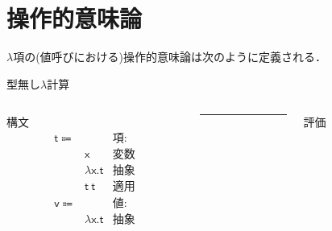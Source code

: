 \documentclass[9pt]{beamer}
\begin{document}
\section{操作的意味論}
\begin{frame}
$\lambda$項の(値呼びにおける)操作的意味論は次のように定義される．
\begin{block}{型無し$\lambda$計算}
    \begin{columns}\begin{column}{0.48\textwidth}
    構文\begin{align*}
\mathsf{t}\Coloneq& &\text{項:}\\
&\mathsf{x} &\text{変数}\\
&\mathsf{\lambda\mathsf{x}.\mathsf{t}} &\text{抽象}\\
&\mathsf{t}\ \mathsf{t} &\text{適用}\\
\mathsf{v}\Coloneq & &\text{値:}\\
&\lambda\mathsf{x}.\mathsf{t} &\text{抽象}
\end{align*}\end{column}
\begin{column}{.02\textwidth}
    \rule{.1mm}{0.5\textheight}
\end{column}\begin{column}{0.48\textwidth}評価
    \begin{prooftree}
    \end{prooftree}
    \begin{prooftree}
    \end{prooftree}
    \begin{prooftree}
    \end{prooftree}\end{column}
\end{columns}
\end{block}
\end{frame}
\end{document}
